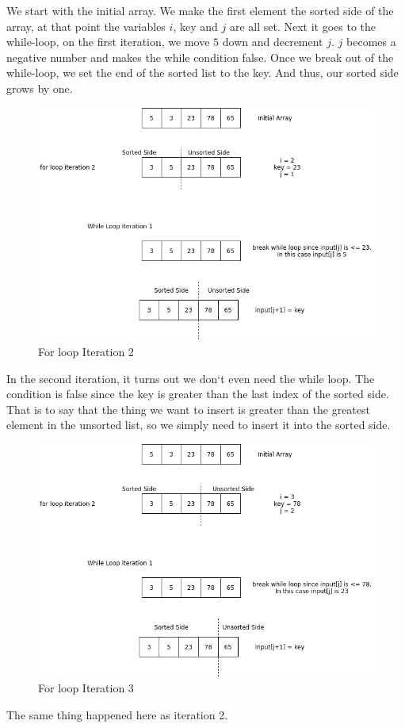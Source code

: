 \documentclass[11]{article}
\begin{document}
We start with the initial array. We make the first element the sorted side of the array, at that point the variables $i$, key and $j$ are all set. Next it goes to the while-loop, on the first iteration, we move $5$ down and decrement $j$. $j$ becomes a negative number and makes the while condition false. Once we break out of the while-loop, we set the end of the sorted list to the key. And thus, our sorted side grows by one.

\begin{figure}[H]
	\centering
	\includegraphics[scale=0.75]{iteration2InsertionSort.png}
	\caption{For loop Iteration 2}
\end{figure}

In the second iteration, it turns out we don`t even need the while loop. The condition is false since the key is greater than the last index of the sorted side. That is to say that the thing we want to insert is greater than the greatest element in the unsorted list, so we simply need to insert it into the sorted side.

\begin{figure}[H]
	\centering
	\includegraphics[scale=0.75]{iteration3InsertionSort.png}
	\caption{For loop Iteration 3}
\end{figure}
The same thing happened here as iteration 2.
\end{document}
